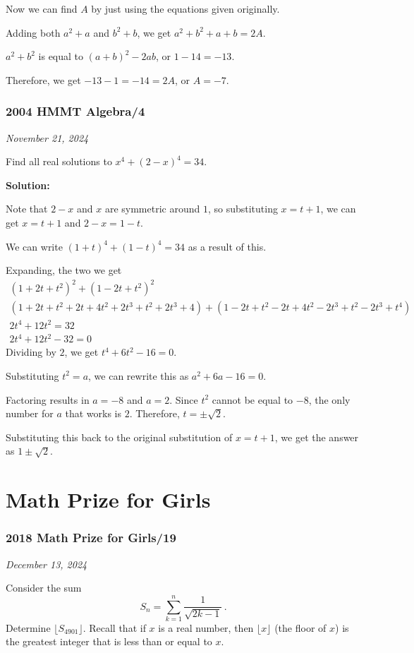 \documentclass[../mathproblems.tex]{subfiles}
\begin{document}
Now we can find $A$ by just using the equations given originally.

Adding both $a^2+a$ and $b^2+b$, we get $a^2+b^2+a+b=2A$.

$a^2+b^2$ is equal to $(a+b)^2-2ab$, or $1-14 = -13$.

Therefore, we get $-13-1=-14 = 2A$, or $A=\boxed{-7}$.

\noindent\hrulefill
\subsubsection*{2004 HMMT Algebra/4} 
\textit{November 21, 2024}

Find all real solutions to $x^4+(2-x)^4=34$.

\textbf{Solution:}

Note that $2-x$ and $x$ are symmetric around $1$, so substituting $x=t+1$, we can get $x=t+1$ and $2-x=1-t$.

We can write $(1+t)^4+(1-t)^4=34$ as a result of this.

Expanding, the two we get
\begin{align*} (1+2t+t^2)^2+(1-2t+t^2)^2\\ (1+2t+t^2+2t+4t^2+2t^3+t^2+2t^3+4)+(1-2t+t^2-2t+4t^2-2t^3+t^2-2t^3+t^4)\\ 2t^4+12t^2=32\\ 2t^4+12t^2-32=0 \end{align*}
Dividing by $2$, we get $t^4+6t^2-16=0$.

Substituting $t^2=a$, we can rewrite this as $a^2+6a-16=0$.

Factoring results in $a=-8$ and $a=2$. Since $t^2$ cannot be equal to $-8$, the only number for $a$ that works is $2$. Therefore, $t=\pm\sqrt{2}$.

Substituting this back to the original substitution of $x=t+1$, we get the answer as $\boxed{1\pm\sqrt{2}}$.

\noindent\hrulefill

\section{Math Prize for Girls}
\subsubsection*{2018 Math Prize for Girls/19}
\textit{December 13, 2024}

Consider the sum
\[ S_n = \sum_{k = 1}^n \frac{1}{\sqrt{2k-1}} \, . \]Determine $\lfloor S_{4901} \rfloor$. Recall that if $x$ is a real number, then $\lfloor x \rfloor$ (the floor of $x$) is the greatest integer that is less than or equal to $x$.
\end{document}
